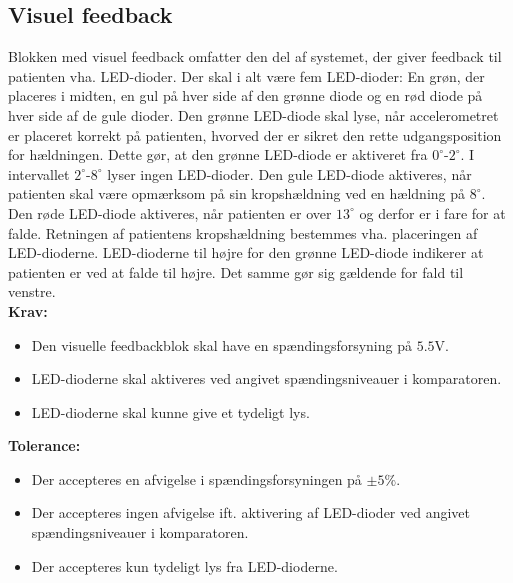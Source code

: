 \subsection{Visuel feedback}\label{visuel_feedback_krav}
Blokken med visuel feedback omfatter den del af systemet, der giver feedback til patienten vha. LED-dioder. Der skal i alt være fem LED-dioder: En grøn, der placeres i midten, en gul på hver side af den grønne diode og en rød diode på hver side af de gule dioder. Den grønne LED-diode skal lyse, når accelerometret er placeret korrekt på patienten, hvorved der er sikret den rette udgangsposition for hældningen. Dette gør, at den grønne LED-diode er aktiveret fra $0^{\circ}$-$2^{\circ}$. I intervallet $2^{\circ}$-$8^{\circ}$ lyser ingen LED-dioder. Den gule LED-diode aktiveres, når patienten skal være opmærksom på sin kropshældning ved en hældning på $8^{\circ}$. Den røde LED-diode aktiveres, når patienten er over $13^{\circ}$ og derfor er i fare for at falde. Retningen af patientens kropshældning bestemmes vha. placeringen af LED-dioderne. LED-dioderne til højre for den grønne LED-diode indikerer at patienten er ved at falde til højre. Det samme gør sig gældende for fald til venstre. 
\\
\textbf{Krav:}
\begin{itemize}
	\item Den visuelle feedbackblok skal have en spændingsforsyning på  $5.5$V.
	\item LED-dioderne skal aktiveres ved angivet spændingsniveauer i komparatoren.
	\item LED-dioderne skal kunne give et tydeligt lys.
\end{itemize}
\textbf{Tolerance:}
\begin{itemize}
	\item Der accepteres en afvigelse i spændingsforsyningen på $\pm5\%$.
	\item Der accepteres ingen afvigelse ift. aktivering af LED-dioder ved angivet spændingsniveauer i komparatoren.
	\item Der accepteres kun tydeligt lys fra LED-dioderne.
\end{itemize}
